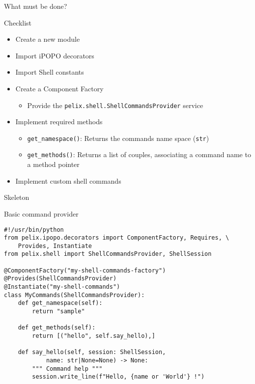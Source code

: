 \begin{frame}{What must be done?}
\begin{block}{Checklist}
\begin{itemize}
\item Create a new module
\item Import iPOPO decorators
\item Import Shell constants
\item Create a Component Factory
\begin{itemize}
\item Provide the \texttt{\scriptsize pelix.shell.ShellCommandsProvider} service
\end{itemize}
\item Implement required methods
\begin{itemize}
\item \texttt{\scriptsize get\_namespace()}: Returns the commands name space (\texttt{\scriptsize str})
\item \texttt{\scriptsize get\_methods()}: Returns a list of couples, associating a command name to a method pointer
\end{itemize}
\item Implement custom shell commands
\end{itemize}
\end{block}
\end{frame}

\begin{frame}[fragile]{Skeleton}
\begin{block}{Basic command provider}
\begin{verbatim}
#!/usr/bin/python
from pelix.ipopo.decorators import ComponentFactory, Requires, \
    Provides, Instantiate
from pelix.shell import ShellCommandsProvider, ShellSession

@ComponentFactory("my-shell-commands-factory")
@Provides(ShellCommandsProvider)
@Instantiate("my-shell-commands")
class MyCommands(ShellCommandsProvider):
    def get_namespace(self):
        return "sample"

    def get_methods(self):
        return [("hello", self.say_hello),]

    def say_hello(self, session: ShellSession,
            name: str|None=None) -> None:
        """ Command help """
        session.write_line(f"Hello, {name or 'World'} !")
\end{verbatim}
\end{block}
\end{frame}
